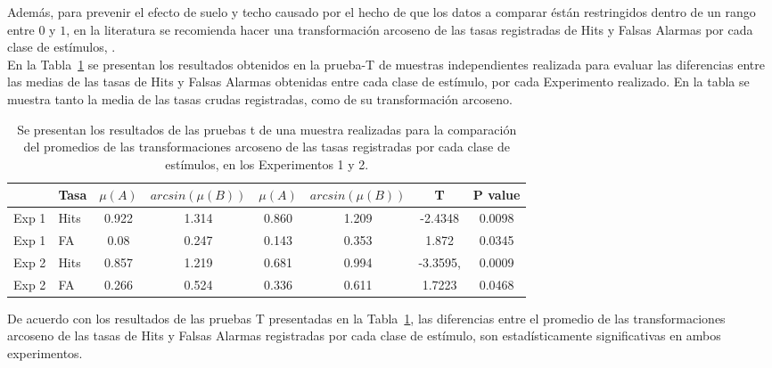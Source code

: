 Además, para prevenir el efecto de suelo y techo causado por el hecho de que los datos a comparar éstán restringidos dentro de un rango entre $0$ y $1$, en la literatura se recomienda hacer una transformación arcoseno de las tasas registradas de Hits y Falsas Alarmas por cada clase de estímulos, \parencite{Glanzer1990}.\\ 

En la Tabla~\ref{Tabla_t-HitsyFA} se presentan los resultados obtenidos en la prueba-T de muestras independientes realizada para evaluar las diferencias entre las medias de las tasas de Hits y Falsas Alarmas obtenidas entre cada clase de estímulo, por cada Experimento realizado. En la tabla se muestra tanto la media de las tasas crudas registradas, como de su transformación arcoseno.\\

\begin{table}
\caption[Prueba T para evaluar diferencias entre las tasas de ejecución (Hits y F. Alarmas) promedio registradas por cada condición]{Se presentan los resultados de las pruebas t de una muestra realizadas para la comparación del promedios de las transformaciones arcoseno de las tasas registradas por cada clase de estímulos, en los Experimentos 1 y 2.}
\label{Tabla_t-HitsyFA}
\centering
\begin{tabular}{l l | c c c c c c}
\toprule
\textbf{} & \textbf{Tasa} & \textbf{$\mu(A)$} & \textbf{$arcsin(\mu(B))$} & \textbf{$\mu(A)$} & \textbf{$arcsin(\mu(B))$} &\textbf{T} & \textbf{P value}\\
\midrule
Exp 1 & Hits & 0.922 & 1.314 & 0.860 & 1.209 & -2.4348 & 0.0098 \\
Exp 1 & FA & 0.08 & 0.247 & 0.143 & 0.353 & 1.872 & 0.0345 \\
Exp 2 & Hits & 0.857 & 1.219 & 0.681 & 0.994 & -3.3595, & 0.0009 \\
Exp 2 & FA & 0.266 & 0.524 & 0.336 & 0.611 & 1.7223 & 0.0468 \\
\bottomrule
\end{tabular}
\end{table}

De acuerdo con los resultados de las pruebas T presentadas en la Tabla~\ref{Tabla_t-HitsyFA}, las diferencias entre el promedio de las transformaciones arcoseno de las tasas de Hits y Falsas Alarmas registradas por cada clase de estímulo, son estadísticamente significativas en ambos experimentos.\\

